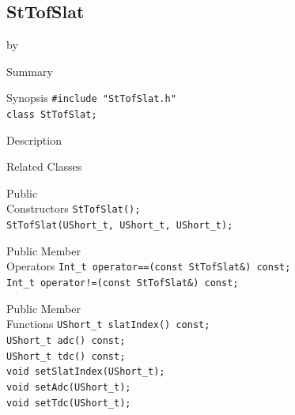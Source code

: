 \documentclass[twoside]{article}
\newcommand{\entrylabel}[1]{\mbox{\textbf{{#1}}}\hfil}%
\newenvironment{entry}
{\begin{list}{}%
    {\renewcommand{\makelabel}{\entrylabel}%
     \setlength{\labelwidth}{90pt}%
     \setlength{\leftmargin}{\labelwidth}
     \advance\leftmargin by \labelsep%
      }%
    }%
  {\end{list}}
\newcommand{\Entrylabel}[1]%
{\raisebox{0pt}[1ex][0pt]{\makebox[\labelwidth][l]%
    {\parbox[t]{\labelwidth}{\hspace{0pt}\textbf{{#1}}}}}}
\newenvironment{Entry}%
{\renewcommand{\entrylabel}{\Entrylabel}\begin{entry}}%
  {\end{entry}}
\begin{document}
\subsection{StTofSlat}
\label{sec:StTofSlat}
\begin{Entry}
\item[Summary]
\item[Synopsis]
    \verb+#include "StTofSlat.h"+\\
    \verb+class StTofSlat;+\\
\item[Description]
\item[Related Classes]
\item[Public\\ Constructors]
    \verb+StTofSlat();+\\
    \verb+StTofSlat(UShort_t, UShort_t, UShort_t);+\\
\item[Public Member\\ Operators]
    \verb+Int_t operator==(const StTofSlat&) const;+\\
    \verb+Int_t operator!=(const StTofSlat&) const;+\\
\item[Public Member\\ Functions]
    \verb+UShort_t slatIndex() const;+\\
    \verb+UShort_t adc() const;+\\
    \verb+UShort_t tdc() const;+\\
    \verb+void setSlatIndex(UShort_t);+\\
    \verb+void setAdc(UShort_t);+\\
    \verb+void setTdc(UShort_t);+\\
\end{Entry}
\clearpage
\end{document}
